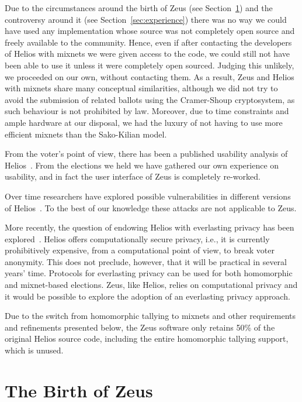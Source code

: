 \documentclass[letterpaper,10pt]{article}
\begin{document}
Due to the circumstances around the birth of Zeus (see
Section~\ref{sec:birth}) and the controversy around it (see
Section~\ref{sec:experience}) there was no way we could have used any
implementation whose source was not completely open source and
freely available to the community. Hence, even if after contacting the
developers of Helios with mixnets we were given access to the code, we
could still not have been able to use it unless it were completely
open sourced. Judging this unlikely, we proceeded on our own, without
contacting them. As a result, Zeus and Helios with mixnets share
many conceptual similarities, although we did not try to avoid the
submission of related ballots using the Cramer-Shoup cryptosystem, as
such behaviour is not prohibited by law. Moreover, due to time
constraints and ample hardware at our disposal, we had the luxury of
not having to use more efficient mixnets than the Sako-Kilian
model. 

From the voter's point of view, there has been a published usability
analysis of Helios~\cite{karayumak:2011}. From the
elections we held we have gathered our own experience on usability,
and in fact the user interface of Zeus is completely re-worked.

Over time researchers have explored possible vulnerabilities in
different versions of Helios~\cite{estehghari:2010,heiderich:2011}. To
the best of our knowledge these attacks are not applicable to Zeus.

More recently, the question of endowing Helios with everlasting
privacy has been explored~\cite{demirel:2012}. Helios offers
computationally secure privacy, i.e., it is currently prohibitively
expensive, from a computational point of view, to break voter
anonymity. This does not preclude, however, that it will be
practical in several years' time. Protocols for everlasting privacy
can be used for both homomorphic and mixnet-based elections. Zeus,
like Helios, relies on computational privacy and it would be possible
to explore the adoption of an everlasting privacy approach.

Due to the switch from homomorphic tallying to mixnets and other
requirements and refinements presented below, the Zeus software only
retains 50\% of the original Helios source code, including the entire
homomorphic tallying support, which is unused.

\section{The Birth of Zeus}
\label{sec:birth}
\end{document}
